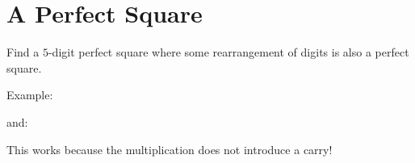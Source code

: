 \documentclass[12pt]{article}
\begin{document}
\section*{A Perfect Square}
Find a $5$-digit perfect square where some rearrangement of digits is also a perfect square. 

\begin{answer}
Example:
\begin{center}
\qquad
\end{center}
and:
\begin{center}
\qquad
\end{center}

This works because the multiplication does not introduce a carry!
\end{answer}
\end{document}
